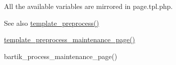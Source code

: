 All the available variables are mirrored in page.tpl.php.

\begin{DoxySeeAlso}{See also}
\hyperlink{includes_2theme_8inc_a3eeb7bcdba7ef4859f99586da264d347}{template\_\-preprocess()} 

\hyperlink{includes_2theme_8inc_a14a92df5f5e74cebcf7fb680885e58a5}{template\_\-preprocess\_\-maintenance\_\-page()} 

bartik\_\-process\_\-maintenance\_\-page() 
\end{DoxySeeAlso}
